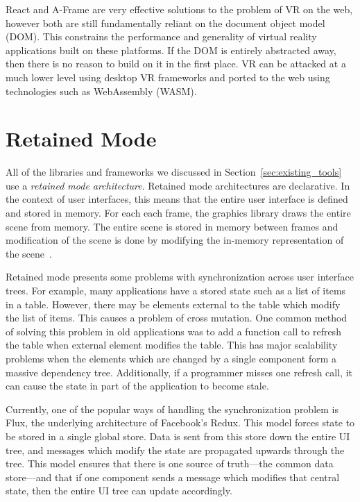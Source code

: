 \documentclass[conference,12pt]{IEEEtran}
\begin{document}
React and A-Frame are very effective solutions to the problem of VR on the web,
however both are still fundamentally reliant on the document object model (DOM).
This constrains the performance and generality of virtual reality applications
built on these platforms.  If the DOM is entirely abstracted away, then there is
no reason to build on it in the first place. VR can be attacked at a much lower
level using desktop VR frameworks and ported to the web using technologies such
as WebAssembly (WASM).

\section{Retained Mode}\label{sec:retained-mode}

All of the libraries and frameworks we discussed in
Section~\ref{sec:existing_tools} use a \textit{retained mode architecture}.
Retained mode architectures are declarative. In the context of user interfaces,
this means that the entire user interface is defined and stored in memory. For
each each frame, the graphics library draws the entire scene from memory. The
entire scene is stored in memory between frames and modification of the scene is
done by modifying the in-memory representation of the
scene~\cite{Microsoft:Retained-vs-Immediate}.

Retained mode presents some problems with synchronization across user interface
trees. For example, many applications have a stored state such as a list of
items in a table. However, there may be elements external to the table which
modify the list of items. This causes a problem of cross mutation. One common
method of solving this problem in old applications was to add a function call to
refresh the table when external element modifies the table. This has major
scalability problems when the elements which are changed by a single component
form a massive dependency tree.  Additionally, if a programmer misses one
refresh call, it can cause the state in part of the application to become stale.

Currently, one of the popular ways of handling the synchronization problem is
Flux, the underlying architecture of Facebook's Redux. This model forces state
to be stored in a single global store. Data is sent from this store down the
entire UI tree, and messages which modify the state are propagated upwards
through the tree. This model ensures that there is one source of truth---the
common data store---and that if one component sends a message which modifies
that central state, then the entire UI tree can update accordingly.
\end{document}
